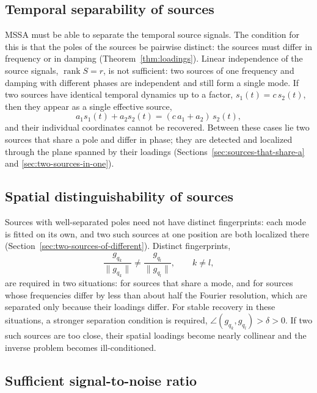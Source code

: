 \documentclass{article}
\begin{document}
\subsection{Temporal separability of sources}\label{sec:temporal-separability-of-sources}

MSSA must be able to separate the temporal source signals. The condition for this is that the poles of the sources be pairwise distinct: the sources must differ in frequency or in damping (Theorem~\ref{thm:loadings}). Linear independence of the source signals, $\operatorname{rank} S = r$, is not sufficient: two sources of one frequency and damping with different phases are independent and still form a single mode. If two sources have identical temporal dynamics up to a factor, $s_1(t) = c\, s_2(t)$, then they appear as a single effective source, \[
a_1 s_1(t) + a_2 s_2(t) = (c\, a_1 + a_2)\, s_2(t),
\] and their individual coordinates cannot be recovered. Between these cases lie two sources that share a pole and differ in phase; they are detected and localized through the plane spanned by their loadings (Sections~\ref{sec:sources-that-share-a} and \ref{sec:two-sources-in-one}).

\subsection{Spatial distinguishability of sources}\label{sec:spatial-distinguishability-of-sources}

Sources with well-separated poles need not have distinct fingerprints: each mode is fitted on its own, and two such sources at one position are both localized there (Section~\ref{sec:two-sources-of-different}). Distinct fingerprints, \[
\frac{g_{q_k}}{\lVert g_{q_k} \rVert} \neq \frac{g_{q_l}}{\lVert g_{q_l} \rVert}, \qquad k \neq l,
\] are required in two situations: for sources that share a mode, and for sources whose frequencies differ by less than about half the Fourier resolution, which are separated only because their loadings differ. For stable recovery in these situations, a stronger separation condition is required, $\angle(g_{q_k}, g_{q_l}) > \delta > 0$. If two such sources are too close, their spatial loadings become nearly collinear and the inverse problem becomes ill-conditioned.

\subsection{Sufficient signal-to-noise ratio}\label{sec:sufficient-signal-to-noise}
\end{document}
